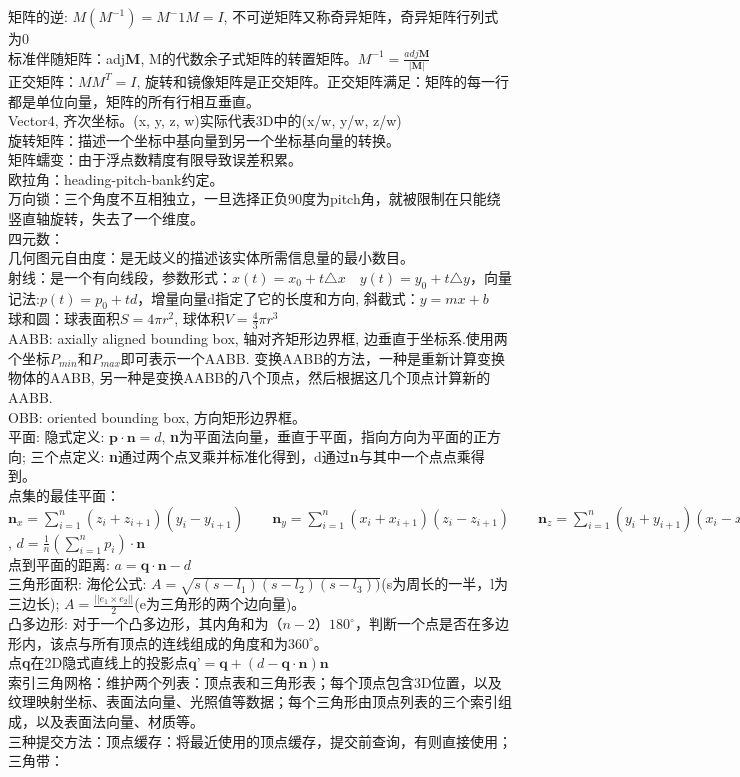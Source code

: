 \documentclass[UTF8]{ctexart}
\begin{document}
矩阵的逆: $M(M^{-1}) = M^-1M = I$, 不可逆矩阵又称奇异矩阵，奇异矩阵行列式为0\\
标准伴随矩阵：adj\textbf{M}, M的代数余子式矩阵的转置矩阵。$M^{-1} = \frac{adj\textbf{M}}{|\textbf{M}|}$\\
正交矩阵：\textbf{$MM^{T} = I$}, 旋转和镜像矩阵是正交矩阵。正交矩阵满足：矩阵的每一行都是单位向量，矩阵的所有行相互垂直。\\
Vector4, 齐次坐标。(x, y, z, w)实际代表3D中的(x/w, y/w, z/w)\\
旋转矩阵：描述一个坐标中基向量到另一个坐标基向量的转换。\\
矩阵蠕变：由于浮点数精度有限导致误差积累。\\
欧拉角：heading-pitch-bank约定。\\
万向锁：三个角度不互相独立，一旦选择正负90度为pitch角，就被限制在只能绕竖直轴旋转，失去了一个维度。\\
四元数：\\
几何图元自由度：是无歧义的描述该实体所需信息量的最小数目。\\
射线：是一个有向线段，参数形式：$x(t)=x_0+t\triangle x \quad y(t)=y_0+t\triangle y$，向量记法:$p(t)=p_0 + td$，增量向量d指定了它的长度和方向, 斜截式：$y=mx+b$\\
球和圆：球表面积$S=4\pi r^2$, 球体积$V=\frac{4}{3}\pi r^3$\\
AABB: axially aligned bounding box, 轴对齐矩形边界框, 边垂直于坐标系.使用两个坐标$P_{min}$和$P_{max}$即可表示一个AABB. 变换AABB的方法，一种是重新计算变换物体的AABB, 另一种是变换AABB的八个顶点，然后根据这几个顶点计算新的AABB.\\
OBB: oriented bounding box, 方向矩形边界框。\\
平面: 隐式定义: $\textbf{p}\cdot \textbf{n}=d$, \textbf{n}为平面法向量，垂直于平面，指向方向为平面的正方向; 三个点定义: \textbf{n}通过两个点叉乘并标准化得到，d通过\textbf{n}与其中一个点点乘得到。\\
点集的最佳平面：$\textbf{n}_x=\sum_{i=1}^{n}(z_{i}+z_{i+1})(y_{i}-y_{i+1})\qquad \textbf{n}_y=\sum_{i=1}^{n}(x_{i}+x_{i+1})(z_{i}-z_{i+1})\qquad \textbf{n}_z=\sum_{i=1}^{n}(y_{i}+y_{i+1})(x_{i}-x_{i+1})$, $d=\frac{1}{n}(\sum_{i=1}^{n}p_{i})\cdot \textbf{n}$\\
点到平面的距离: $a=\textbf{q}\cdot \textbf{n}-d$\\
三角形面积: 海伦公式: $A=\sqrt{s(s-l_1)(s-l_2)(s-l_3))}$(s为周长的一半，l为三边长); $A=\frac{||e_1\times e_2||}{2}$(e为三角形的两个边向量)。\\
凸多边形: 对于一个凸多边形，其内角和为$（n-2）180^{\circ}$，判断一个点是否在多边形内，该点与所有顶点的连线组成的角度和为$360^{\circ}$。\\
点\textbf{q}在2D隐式直线上的投影点$\textbf{q'}=\textbf{q}+(d-\textbf{q}\cdot\textbf{n})\textbf{n}$\\
索引三角网格：维护两个列表：顶点表和三角形表；每个顶点包含3D位置，以及纹理映射坐标、表面法向量、光照值等数据；每个三角形由顶点列表的三个索引组成，以及表面法向量、材质等。\\
三种提交方法：顶点缓存：将最近使用的顶点缓存，提交前查询，有则直接使用；三角带：
\end{document}
